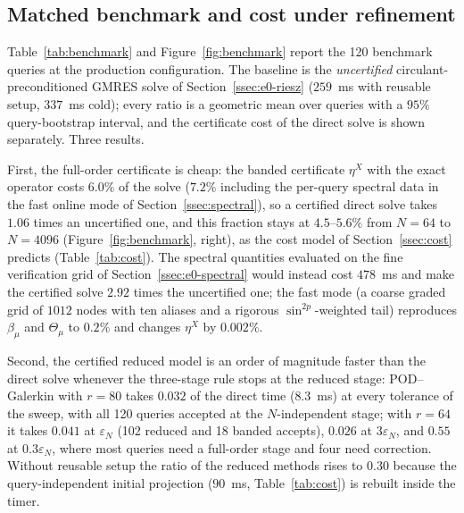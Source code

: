 \documentclass[11pt]{amsart}
\theoremstyle{remark}
\newcommand{\Thmu}{\Theta_\mu}
\begin{document}
\subsection{Matched benchmark and cost under refinement}
\label{ssec:benchmark}\label{ssec:scaling-results}
Table~\ref{tab:benchmark} and Figure~\ref{fig:benchmark} report the 120 benchmark queries at the
production configuration.  The baseline is the \emph{uncertified} circulant-preconditioned GMRES
solve of Section~\ref{ssec:e0-riesz} ($259$~ms with reusable setup, $337$~ms cold); every ratio is a
geometric mean over queries with a $95\%$ query-bootstrap interval, and the certificate cost of the
direct solve is shown separately.  Three results.

First, the full-order certificate is cheap: the banded certificate $\eta^X$ with the exact
operator costs $6.0\%$ of the solve ($7.2\%$ including the per-query spectral data in the fast
online mode of Section~\ref{ssec:spectral}), so a certified direct solve takes $1.06$ times an
uncertified one, and this fraction stays at $4.5$--$5.6\%$ from $N=64$ to $N=4096$
(Figure~\ref{fig:benchmark}, right), as the cost model of Section~\ref{ssec:cost} predicts
(Table~\ref{tab:cost}).  The spectral quantities evaluated on the fine verification grid of
Section~\ref{ssec:e0-spectral} would instead cost $478$~ms and make the certified solve $2.92$
times the uncertified one; the fast mode (a coarse graded grid of $1012$ nodes with ten aliases and
a rigorous $\sin^{2p}$-weighted tail) reproduces $\beta_\mu$ and $\Thmu$ to $0.2\%$ and changes
$\eta^X$ by $0.002\%$.

Second, the certified reduced model is an order of magnitude faster than the direct solve
whenever the three-stage rule stops at the reduced stage: POD--Galerkin with $r=80$ takes
$0.032$ of the direct time ($8.3$~ms) at every tolerance of the sweep, with all 120 queries accepted
at the $N$-independent stage; with $r=64$ it takes $0.041$ at $\varepsilon_N$ (102 reduced and 18
banded accepts), $0.026$ at $3\varepsilon_N$, and $0.55$ at $0.3\varepsilon_N$, where most queries
need a full-order stage and four need correction.  Without reusable setup the ratio of the
reduced methods rises to $0.30$ because the query-independent initial projection
($90$~ms, Table~\ref{tab:cost}) is rebuilt inside the timer.
\end{document}

